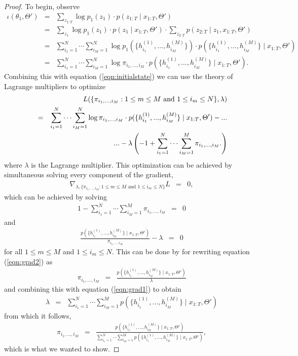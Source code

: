 \documentclass{amsart}
\begin{document}
\begin{proof}
To begin, observe 
\begin{eqnarray*}
\iota(\theta_1,\Theta') &=& \sum_{z_{1:T}}\log p_1(z_1)\cdot p(z_{1:T}\mid x_{1:T},\Theta')\\
& = & \sum_{z_1}\log p_1(z_1)\cdot p(z_1\mid x_{1:T},\Theta')\cdot \sum_{z_{2:T}}p(z_{2:T}\mid z_1,x_{1:T},\Theta')\\
& = & \sum_{i_1=1}^N\cdots \sum_{i_M=1}^N\log p_1(\{h_{i_1}^{(1)},...,h_{i_M}^{(M)}\})\cdot p(\{h_{i_1}^{(1)},...,h_{i_M}^{(M)}\}\mid x_{1:T},\Theta')\\
& = & \sum_{i_1=1}^N\cdots \sum_{i_M=1}^N\log \pi_{{i_1},...,{i_M}}\cdot p(\{h_{i_1}^{(1)},...,h_{i_M}^{(M)}\}\mid x_{1:T},\Theta').
\end{eqnarray*}
Combining this with equation (\ref{eqn:initialstate}) we can use the theory of Lagrange multipliers to optimize 
\begin{eqnarray*}
&&L(\{\pi_{{i_1},...,{i_M}}:1\leq m\leq M\text{ and }1\leq i_m\leq N\}, \lambda) \\
& = & \sum_{i_1=1}^N\cdots \sum_{i_M=1}^N\log \pi_{{i_1},...,{i_M}}\cdot p(\{h_{i_1}^{(1)},...,h_{i_M}^{(M)}\}\mid x_{1:T},\Theta') -...\\
&&\hspace{10mm}...- \lambda \left(-1 + \sum_{i_1=1}^N\cdots \sum_{i_M=1}^M \pi_{i_1,...,i_M}.\right) 
\end{eqnarray*}
where $\lambda$ is the Lagrange multiplier.  This optimization can be achieved by simultaneous solving every component of the gradient, 
\begin{eqnarray*}
\nabla_{\lambda,\{\pi_{{i_1},...,{i_M}}:1\leq m\leq M \text{ and } 1\leq i_m\leq N\}}L &=& 0,
\end{eqnarray*}
which can be achieved by solving 
\begin{eqnarray}\label{eqn:grad1}
1 - \sum_{i_1=1}^N\cdots \sum_{i_M=1}^M \pi_{i_1,...,i_M} &=& 0
\end{eqnarray}
and 
\begin{eqnarray}\label{eqn:grad2}
\frac{p(\{h_{i_1}^{(1)},...,h_{i_M}^{(M)}\}\mid x_{1:T},\Theta')}{\pi_{{i_1},...,{i_M}}} - \lambda &=& 0
\end{eqnarray}
for all $1\leq m\leq M$ and $1\leq i_m\leq N$.  This can be done by for rewriting equation (\ref{eqn:grad2}) as 
\begin{eqnarray*}
 \pi_{{i_1},...,{i_M}}&=&\frac{p(\{h_{i_1}^{(1)},...,h_{i_M}^{(M)}\}\mid x_{1:T},\Theta')}{\lambda}
\end{eqnarray*}
and combining this with equation (\ref{eqn:grad1}) to obtain 
\begin{eqnarray*}
\lambda&=&\sum_{i_1=1}^N\cdots \sum_{i_M=1}^M p(\{h_{i_1}^{(1)},...,h_{i_M}^{(M)}\}\mid x_{1:T},\Theta')
\end{eqnarray*}
from which it follows,
\begin{eqnarray*}
\pi_{{i_1},...,{i_M}}&=&\frac{p(\{h_{i_1}^{(1)},...,h_{i_M}^{(M)}\}\mid x_{1:T},\Theta')}{\sum_{i_1=1}^N\cdots \sum_{i_M=1}^M p(\{h_{i_1}^{(1)},...,h_{i_M}^{(M)}\}\mid x_{1:T},\Theta')},
\end{eqnarray*}
which is what we wanted to show.
\end{proof}
\end{document}
